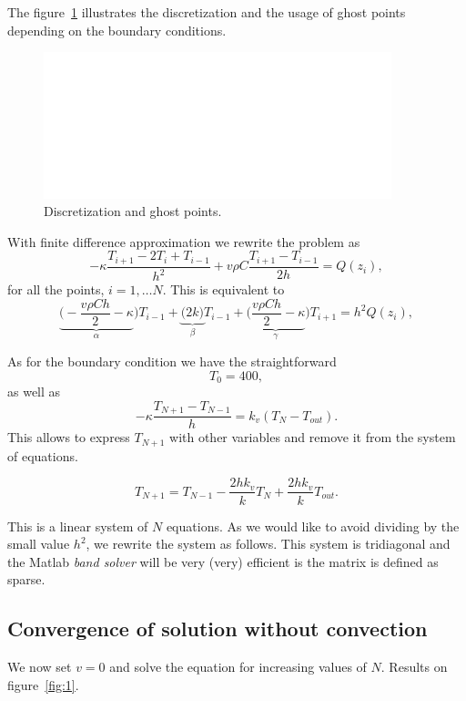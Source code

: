 \documentclass[11pt,a4paper]{report}
\begin{document}
The figure~\ref{fig:0} illustrates the discretization and the usage of ghost points depending on the boundary conditions.

\begin{figure}[!h]
\centering
\includegraphics[width = 0.9\textwidth]{./white.png}
\caption{Discretization and ghost points.}
\label{fig:0}
\end{figure}




With finite difference approximation we rewrite the problem as 
$$-\kappa \dfrac{T_{i+1}-2T_{i}+T_{i-1}}{h^{2}}
+ v\rho C\dfrac{T_{i+1}-T_{i-1}}{2h}=Q(z_{i}),$$
for all the points, $i=1, \dots N$. This is equivalent to
$$\underbrace{\Big(-\dfrac{v\rho Ch}{2}  -\kappa    }_{\alpha}\Big) T_{i-1} 
+ \underbrace{\Big(2k\Big)}_{\beta} T_{i-1}
+ \underbrace{\Big( \dfrac{v\rho Ch}{2}  -\kappa    }_{\gamma}\Big) T_{i+1}
=h^{2}Q(z_{i}),$$


As for the boundary condition we have 
the straightforward $$T_{0}=400,$$
as well as
$$-\kappa \dfrac{T_{N+1}-T_{N-1}}{h}=k_{v}(T_{N}-T_{out}).$$
This allows to express $T_{N+1}$ with other variables and remove it from the system of equations.

$$T_{N+1}=T_{N-1}-\dfrac{2hk_{v}}{k}T_{N}+\dfrac{2hk_{v}}{k}T_{out}.$$


This is a linear system of $N$ equations. As we would like to avoid dividing by the small value $h^2$, we rewrite the system as follows. This system is tridiagonal and the Matlab \textit{band solver} will be very (very) efficient is the matrix is defined as sparse.





\subsection{Convergence of solution without convection}

We now set $v=0$ and solve the equation for increasing values of $N$. Results on figure~\ref{fig:1}.
\end{document}
